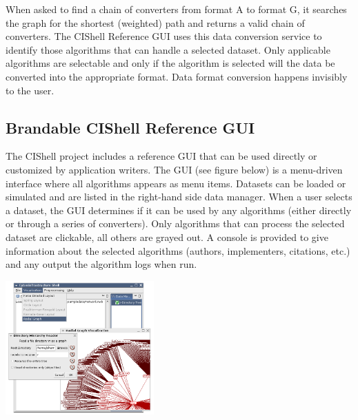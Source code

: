 When asked to find a chain of converters from format A to format G, it searches 
the graph for the shortest (weighted) path and returns a valid chain of 
converters. The CIShell Reference GUI uses this data conversion service to 
identify those algorithms that can handle a selected dataset. Only applicable 
algorithms are selectable and only if the algorithm is selected will the data 
be converted into the appropriate format. Data format conversion happens 
invisibly to the user.

\subsection{Brandable CIShell Reference GUI}

The CIShell project includes a reference GUI that can be used directly or 
customized by application writers. The GUI (see figure below) is a menu-driven 
interface where all algorithms appears as menu items. Datasets can be loaded or 
simulated and are listed in the right-hand side data manager. When a user 
selects a dataset, the GUI determines if it can be used by any algorithms 
(either directly or through a series of converters). Only algorithms that can 
process the selected dataset are clickable, all others are grayed out. A 
console is provided to give information about the selected algorithms (authors, 
implementers, citations, etc.) and any output the algorithm logs when run. 

\begin{center}
\includegraphics[width=2.24in]{graphics/cishell-using1.png}
\end{center}